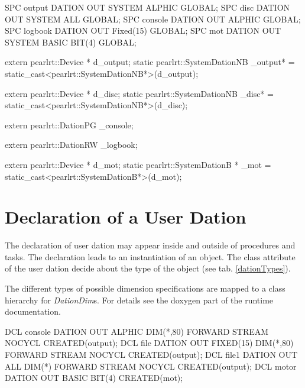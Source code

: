 \begin{PEARLCode}
SPC output DATION OUT SYSTEM ALPHIC GLOBAL;
SPC disc DATION OUT SYSTEM ALL GLOBAL;
SPC console DATION OUT ALPHIC GLOBAL;
SPC logbook DATION OUT Fixed(15) GLOBAL;
SPC mot DATION OUT SYSTEM BASIC BIT(4) GLOBAL;
\end{PEARLCode}

\begin{CppCode}
extern pearlrt::Device * d_output;
static pearlrt::SystemDationNB _output* = 
             static_cast<pearlrt::SystemDationNB*>(d_output);

extern pearlrt::Device * d_disc;
static pearlrt::SystemDationNB _disc* = 
             static_cast<pearlrt::SystemDationNB*>(d_disc);

extern pearlrt::DationPG _console;

extern pearlrt::DationRW _logbook;

extern pearlrt::Device * d_mot;
static pearlrt::SystemDationB * _mot = 
             static_cast<pearlrt::SystemDationB*>(d_mot);
\end{CppCode}

\section{Declaration of a User Dation}
The declaration of user dation may appear inside and outside of procedures and 
tasks.
The declaration leads to an instantiation of an object. 
The class attribute of the user dation decide about the type of the object
(see tab. \ref{dationTypes}).

The different types of possible dimension specifications are mapped to
a class hierarchy for {\em DationDim}s. For details see the doxygen part 
of the runtime documentation.

\begin{PEARLCode}
DCL console DATION OUT ALPHIC DIM(*,80) FORWARD STREAM NOCYCL CREATED(output);
DCL file DATION OUT FIXED(15) DIM(*,80) FORWARD STREAM NOCYCL CREATED(output);
DCL file1 DATION OUT ALL DIM(*) FORWARD STREAM NOCYCL CREATED(output);
DCL motor DATION OUT BASIC BIT(4) CREATED(mot);
\end{PEARLCode}

